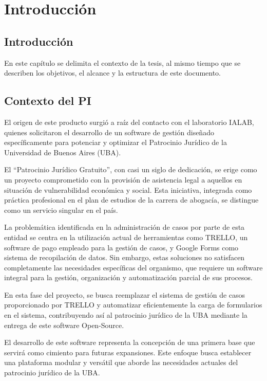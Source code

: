 \chapter{Introducción}
\label{cap:introduccion}

\section{Introducción}
\label{sec:introduccion:intro}
En este capítulo se delimita el contexto de la tesis, al mismo tiempo que se describen los objetivos, el alcance y la estructura de este documento.

\section{Contexto del PI}
\label{sec:introduccion:contexto}
El origen de este producto surgió a raíz del contacto con el laboratorio IALAB, quienes solicitaron el desarrollo de un software de gestión diseñado específicamente para potenciar y optimizar el Patrocinio Jurídico de la Universidad de Buenos Aires (UBA).

El ``Patrocinio Jurídico Gratuito'', con casi un siglo de dedicación, se erige como un proyecto comprometido con la provisión de asistencia legal a aquellos en situación de vulnerabilidad económica y social. Esta iniciativa, integrada como práctica profesional en el plan de estudios de la carrera de abogacía, se distingue como un servicio singular en el país.

La problemática identificada en la administración de casos por parte de esta entidad se centra en la utilización actual de herramientas como TRELLO, un software de pago empleado para la gestión de casos, y Google Forms como sistema de recopilación de datos. Sin embargo, estas soluciones no satisfacen completamente las necesidades específicas del organismo, que requiere un software integral para la gestión, organización y automatización parcial de sus procesos.

En esta fase del proyecto, se busca reemplazar el sistema de gestión de casos proporcionado por TRELLO y automatizar eficientemente la carga de formularios en el sistema, contribuyendo así al patrocinio jurídico de la UBA mediante la entrega de este software Open-Source.

El desarrollo de este software representa la concepción de una primera base que servirá como cimiento para futuras expansiones. Este enfoque busca establecer una plataforma modular y versátil que aborde las necesidades actuales del patrocinio jurídico de la UBA.



